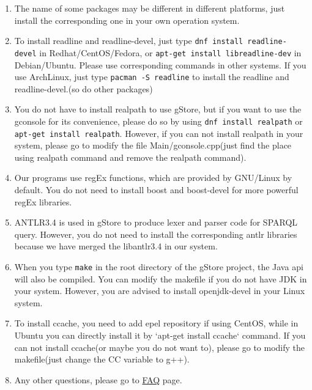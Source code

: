 \documentclass[titlepage, a4paper, 12pt]{article}
\begin{document}
\begin{enumerate}
\item
  The name of some packages may be different in different platforms, just install the corresponding one in your own operation system.
\item
  To install readline and readline-devel, just type \texttt{dnf\ install\ readline-devel} in Redhat/CentOS/Fedora, or \texttt{apt-get\ install\ libreadline-dev} in Debian/Ubuntu. Please use corresponding commands in other systems. If you use ArchLinux, just type \texttt{pacman\ -S\ readline} to install the readline and readline-devel.(so do other packages)
\item
  You do not have to install realpath to use gStore, but if you want to use the gconsole for its convenience, please do so by using \texttt{dnf\ install\ realpath} or \texttt{apt-get\ install\ realpath}.  However, if you can not install realpath in your system, please go to modify the file Main/gconsole.cpp(just find the place using realpath command and remove the realpath command).
\item
  Our programs use regEx functions, which are provided by GNU/Linux by default. You do not need to install boost and boost-devel for more powerful regEx libraries.
\item
  ANTLR3.4 is used in gStore to produce lexer and parser code for SPARQL query. However, you do not need to install the corresponding antlr libraries because we have merged the libantlr3.4 in our system.
\item
  When you type \texttt{make} in the root directory of the gStore project, the Java api will also be compiled. You can modify the makefile if you do not have JDK in your system. However, you are advised to install openjdk-devel in your Linux system.
\item
  To install ccache, you need to add epel repository if using CentOS, while in Ubuntu you can directly install it by `apt-get install ccache` command. If you can not install ccache(or maybe you do not want to), please go to modify the makefile(just change the CC variable to g++).
\item
  Any other questions, please go to \hyperref[chapter10]{FAQ} page.
\end{enumerate}

\clearpage

\end{document}
